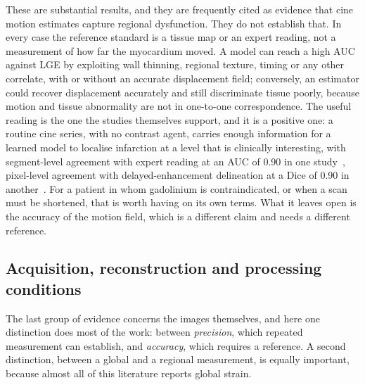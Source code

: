These are substantial results, and they are frequently cited as evidence that cine motion estimates
capture regional dysfunction. They do not establish that. In every case the reference standard is a
tissue map or an expert reading, not a measurement of how far the myocardium moved. A model can
reach a high AUC against LGE by exploiting wall thinning, regional texture, timing or any other
correlate, with or without an accurate displacement field; conversely, an estimator could recover
displacement accurately and still discriminate tissue poorly, because motion and tissue abnormality
are not in one-to-one correspondence. The useful reading is the one the studies themselves support, and it is a
positive one: a routine cine series, with no contrast agent, carries enough information for a learned
model to localise infarction at a level that is clinically interesting, with segment-level agreement
with expert reading at an AUC of 0.90 in one study~\citep{masutani2023dlss}, pixel-level agreement
with delayed-enhancement delineation at a Dice of 0.90 in another~\citep{xu2018}. For a patient in
whom gadolinium is contraindicated, or when a scan must be shortened, that is worth having on its own
terms. What it leaves open is the accuracy of the motion field, which is a different claim and needs
a different reference.

\subsection{Acquisition, reconstruction and processing conditions}\label{sec:conditions}

The last group of evidence concerns the images themselves, and here one distinction does most of the
work: between \emph{precision}, which repeated measurement can establish, and \emph{accuracy}, which
requires a reference. A second distinction, between a global and a regional measurement, is equally
important, because almost all of this literature reports global strain.

